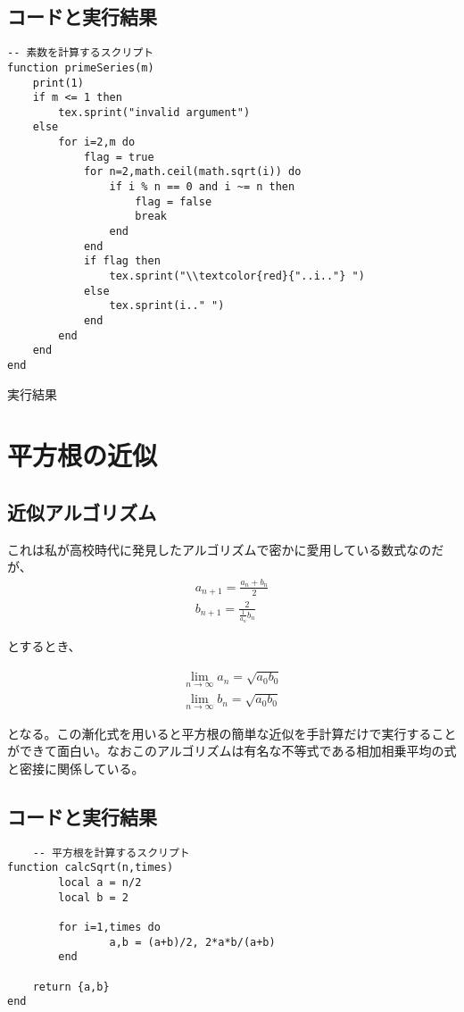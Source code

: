 \documentclass[a4paper]{article}
\begin{document}
	\subsection{コードと実行結果}

	\begin{lstlisting}
-- 素数を計算するスクリプト
function primeSeries(m)
	print(1)
	if m <= 1 then
		tex.sprint("invalid argument")
	else
		for i=2,m do
			flag = true
			for n=2,math.ceil(math.sqrt(i)) do
				if i % n == 0 and i ~= n then
					flag = false
					break
				end
			end
			if flag then
				tex.sprint("\\textcolor{red}{"..i.."} ")
			else
				tex.sprint(i.." ")
			end
		end
	end
end	
	\end{lstlisting}
	\begin{itembox}[l]{実行結果}
		{\scriptsize {}}	
	\end{itembox}


	\section{平方根の近似}
	\subsection{近似アルゴリズム}
	これは私が高校時代に発見したアルゴリズムで密かに愛用している数式なのだが、
	\begin{eqnarray}
		a_{n+1} = \frac{a_{n} + b_{n}}{2} \\
		b_{n+1} = \frac{2}{\frac{1}{a_{n}}{b_{n}}}
	\end{eqnarray}

	とするとき、

	\begin{eqnarray}
		\lim_{n \to \infty} a_{n} = \sqrt{a_{0}b_{0}} \\
		\lim_{n \to \infty} b_{n} = \sqrt{a_{0}b_{0}}
	\end{eqnarray}

	となる。この漸化式を用いると平方根の簡単な近似を手計算だけで実行することができて面白い。なおこのアルゴリズムは有名な不等式である相加相乗平均の式と密接に関係している。

	\subsection{コードと実行結果}
	\begin{lstlisting}
	-- 平方根を計算するスクリプト
function calcSqrt(n,times)
        local a = n/2 
        local b = 2 

        for i=1,times do
                a,b = (a+b)/2, 2*a*b/(a+b)
        end

	return {a,b}
end	
	\end{lstlisting}
\end{document}
